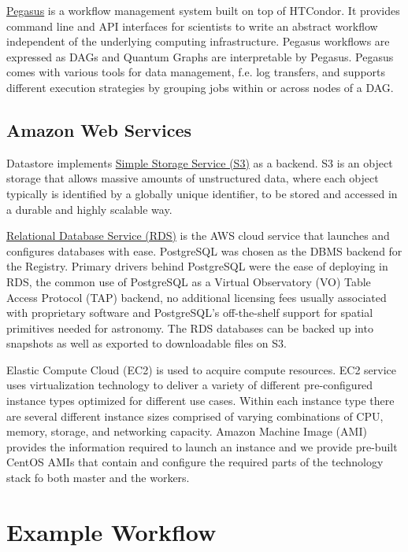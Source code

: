 \documentclass[a4paper, 10pt, conference]{ieeeconf}
\begin{document}
\href{https://pegasus.isi.edu/}{Pegasus} \cite{Deelman:2015:Pegasus} is a workflow management system built on top of HTCondor.
It provides command line and API interfaces for scientists to write an abstract workflow independent of the underlying computing infrastructure. Pegasus workflows are expressed as DAGs and Quantum Graphs are interpretable by Pegasus. Pegasus comes with various tools for data management, f.e. log transfers, and supports different execution strategies by grouping jobs within or across nodes of a DAG.


\subsection{Amazon Web Services}

Datastore implements \href{https://aws.amazon.com/s3/}{Simple Storage Service (S3)} as a backend. S3 is an object storage that allows massive amounts of unstructured data, where each object typically is identified by a globally unique identifier, to be stored and accessed in a durable and highly scalable way.

\href{https://aws.amazon.com/rds/}{Relational Database Service (RDS)} is the AWS cloud service that launches and configures databases with ease. PostgreSQL was chosen as the DBMS backend for the Registry. Primary drivers behind PostgreSQL were the ease of deploying in RDS, the common use of PostgreSQL as a Virtual Observatory (VO) Table Access Protocol (TAP) backend, no additional licensing fees usually associated with proprietary software and PostgreSQL's off-the-shelf support for spatial primitives needed for astronomy. The RDS databases can be backed up into snapshots as well as exported to downloadable files on S3.

Elastic Compute Cloud (EC2) is used to acquire compute resources.  EC2 service uses virtualization technology to deliver a variety of different pre-configured instance types optimized for different use cases. Within each instance type there are several different instance sizes comprised of varying combinations of CPU, memory, storage, and networking capacity. Amazon Machine Image (AMI) provides the information required to launch an instance and we provide pre-built CentOS AMIs that contain and configure the required parts of the technology stack fo both master and the workers. 
\section{Example Workflow}
\end{document}
